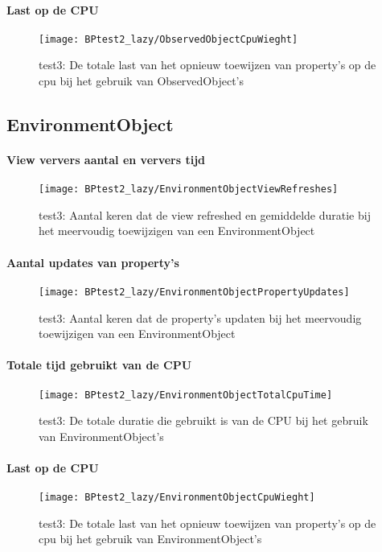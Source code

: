 \paragraph{Last op de CPU}
\begin{figure}[H]
    \centering
    \texttt{[image: BPtest2\_lazy/ObservedObjectCpuWieght]} 
    \caption{test3: De totale last van het opnieuw toewijzen van property's op de cpu bij het gebruik van ObservedObject's}
    \label{fig:cpuWeightObservedObject2}
\end{figure}

\subsection{EnvironmentObject}
\paragraph{View ververs aantal en ververs tijd}
\begin{figure}[H]
    \centering
    \texttt{[image: BPtest2\_lazy/EnvironmentObjectViewRefreshes]} 
    \caption{test3: Aantal keren dat de view refreshed en gemiddelde duratie bij het meervoudig toewijzigen van een EnvironmentObject}
    \label{fig:viewRefreshesEnvironmentObject2}
\end{figure}
\paragraph{Aantal updates van property's}
\begin{figure}[H]
    \centering
    \texttt{[image: BPtest2\_lazy/EnvironmentObjectPropertyUpdates]} 
    \caption{test3: Aantal keren dat de property's updaten bij het meervoudig toewijzigen van een EnvironmentObject}
    \label{fig:propertyUpdatesEnvironmentObject2}
\end{figure}
\paragraph{Totale tijd gebruikt van de CPU}
\begin{figure}[H]
    \centering
    \texttt{[image: BPtest2\_lazy/EnvironmentObjectTotalCpuTime]} 
    \caption{test3: De totale duratie die gebruikt is van de CPU bij het gebruik van EnvironmentObject's}
    \label{fig:cpuUsageTimeEnvironmentObject2}
\end{figure}
\paragraph{Last op de CPU}
\begin{figure}[H]
    \centering
    \texttt{[image: BPtest2\_lazy/EnvironmentObjectCpuWieght]} 
    \caption{test3: De totale last van het opnieuw toewijzen van property's op de cpu bij het gebruik van EnvironmentObject's}
    \label{fig:cpuWeightEnvironmentObject2}
\end{figure}

